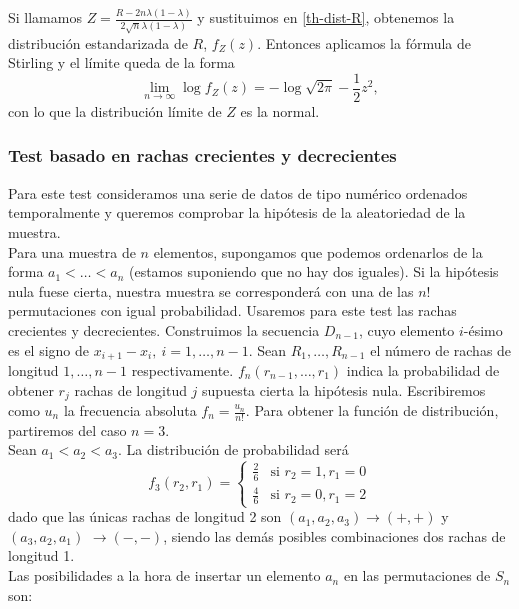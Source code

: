 	Si llamamos $Z = \frac{R - 2n\lambda (1-\lambda)}
{2 \sqrt{n}\lambda (1-\lambda)}$ y sustituimos en 
\ref{th-dist-R}, obtenemos la distribución estandarizada de 
$R$, $f_Z(z)$. Entonces aplicamos la fórmula de Stirling y el 
límite queda de la forma
	\[ \underset{n \rightarrow \infty}{\lim} \log f_Z(z)=
			-\log \sqrt{2\pi} - \frac{1}{2} z^2,	\]
	con lo que la distribución límite de $Z$ es la normal. 
	
	
\subsubsection{Test basado en rachas crecientes y decrecientes}	

	Para este test consideramos una serie de datos de tipo 
numérico ordenados temporalmente y queremos comprobar la 
hipótesis de la aleatoriedad de la muestra.\\
	Para una muestra de $n$ elementos, supongamos que podemos 
ordenarlos de la forma $a_1 < \dots < a_n$ (estamos 
suponiendo que no hay dos iguales). Si la hipótesis nula fuese 
cierta, nuestra muestra se corresponderá con una de las $n!$ 
permutaciones con igual probabilidad. Usaremos para este test 
las rachas crecientes y decrecientes. Construimos la 
secuencia $D_{n-1}$, cuyo elemento $i$-ésimo es el signo de 
$x_{i+1} - x_i,\ i=1, \dots, n-1$. Sean $R_1, \dots, R_{n-1}$ 
el número de rachas de longitud $1, \dots, n-1$ 
respectivamente. $f_n(r_{n-1}, \dots, r_1)$ indica la 
probabilidad de obtener $r_j$ rachas de longitud $j$ supuesta 
cierta la hipótesis nula. Escribiremos como $u_n$ la 
frecuencia absoluta $f_n = \frac{u_n}{n!}$. Para obtener la 
función de distribución, partiremos del caso $n=3$.\\
	Sean $a_1 < a_2 < a_3$. La distribución de probabilidad 
será 
	\[ 
	f_3(r_2, r_1) = 
		\left\lbrace\begin{array}{cc}
			\frac{2}{6} & \text{si } r_2 = 1, r_1 = 0 \\
			\frac{4}{6} & \text{si } r_2 = 0, r_1 = 2 
		\end{array}\right.
	\]
	dado que las únicas rachas de longitud 2 son 
$(a_1, a_2, a_3) \rightarrow (+,+)$ y $(a_3, a_2, a_1)$ 
$\rightarrow (-,-)$, siendo las demás posibles combinaciones 
dos rachas de longitud 1.\\
	Las posibilidades a la hora de insertar un elemento $a_n$ 
en las permutaciones de $S_n$ son:
